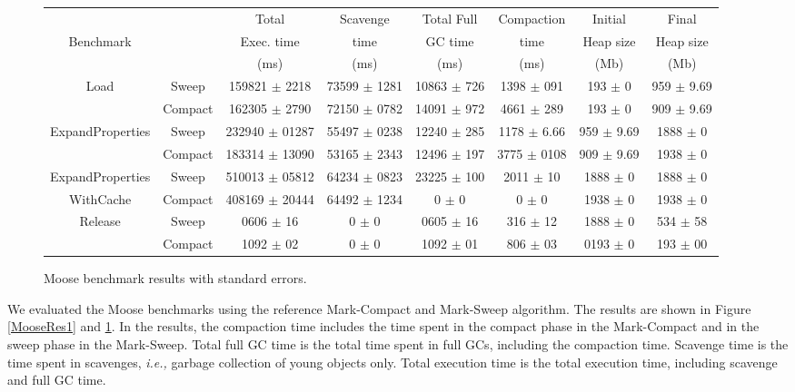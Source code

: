 \documentclass[10pt, sigplan]{acmart}
\begin{document}
\begin{figure}[thb]
\begin{tabular}{|c|c|c|c|c|c|c|c|}
   \hline
  & & Total   & Scavenge  & Total Full  & Compaction  & Initial  & Final \\
 Benchmark & &  Exec. time &  time & GC time &  time &  Heap size & Heap size \\
  & &  (ms) &  (ms) & (ms) &  (ms) &  (Mb) &  (Mb) \\
   \hline
   \multirow{2}{*}{Load} & Sweep 	& 159821 $\pm$ 2218 &	73599 $\pm$ 1281 	& 10863 $\pm$ 726 	&1398 $\pm$ 091 	& 193 $\pm$ 0 	& 959 $\pm$ 9.69 \\
    				    & Compact 	& 162305 $\pm$ 2790 &	72150 $\pm$ 0782 	& 14091 $\pm$ 972 	&4661 $\pm$ 289 	& 193 $\pm$ 0 	& 909 $\pm$ 9.69 \\
   \hline
   \multirow{2}{*}{ExpandProperties} 	& Sweep 		& 232940 $\pm$ 01287 &	55497 $\pm$ 0238 	& 12240 $\pm$ 285 	&1178 $\pm$ 6.66 	& 959 $\pm$ 9.69 & 1888 $\pm$ 0 \\
    				    			& Compact 	& 183314 $\pm$ 13090 &	53165 $\pm$ 2343 	& 12496 $\pm$ 197 	&3775 $\pm$ 0108 	& 909 $\pm$ 9.69 & 1938 $\pm$ 0 \\
   \hline
   ExpandProperties 		& Sweep 		& 510013 $\pm$ 05812 &	64234 $\pm$ 0823 	& 23225 $\pm$ 100 	&2011 $\pm$ 10 	& 1888 $\pm$ 0 	& 1888 $\pm$ 0 \\
   WithCache  			& Compact 	& 408169 $\pm$ 20444 &	64492 $\pm$ 1234 	& 0 $\pm$ 0 		&0 $\pm$ 0 		& 1938 $\pm$ 0 		& 1938 $\pm$ 0 \\
   \hline
   \multirow{2}{*}{Release} 	& Sweep 		& 0606 $\pm$ 16 		&	0 $\pm$ 0 	& 0605 $\pm$ 16 	&316 $\pm$ 12 		& 1888 $\pm$ 0 	& 534 $\pm$ 58 \\
    				    		& Compact 	& 1092 $\pm$ 02 	&	0 $\pm$ 0 	& 1092 $\pm$ 01 		&806 $\pm$ 03 			& 0193 $\pm$ 0 		& 193 $\pm$ 00 \\
   \hline
\end{tabular} 
\caption{Moose benchmark results with standard errors.}
\label{MooseRes2}
\end{figure}

We evaluated the Moose benchmarks using the reference Mark-Compact and Mark-Sweep algorithm. The results are shown in Figure \ref{MooseRes1} and \ref{MooseRes2}. In the results, the compaction time includes the time spent in the compact phase in the Mark-Compact and in the sweep phase in the Mark-Sweep. Total full GC time is the total time spent in full GCs, including the compaction time. Scavenge time is the time spent in scavenges, \emph{i.e.,} garbage collection of young objects only. Total execution time is the total execution time, including scavenge and full GC time.
\end{document}
